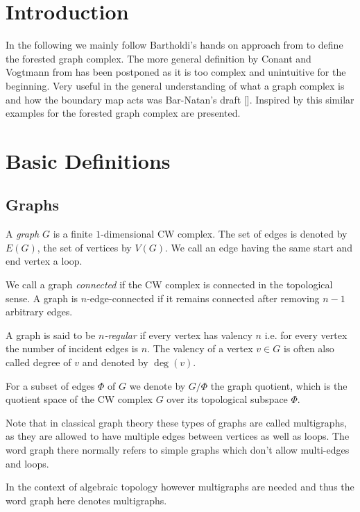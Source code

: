 %

\usepackage{todonotes}
\usepackage{./tikzit/tikzit}
\usepackage{biblatex}



	

\section{Introduction}
In the following we mainly follow Bartholdi's hands on approach from \cite{bartholdi16} to define the forested graph complex.
The more general definition by Conant and Vogtmann from \cite{conant03} has been postponed as it is too complex and unintuitive for the beginning.
Very useful in the general understanding of  what a graph complex is and how the boundary map acts was Bar-Natan's draft [].
Inspired by this similar examples for the forested graph complex are presented.

\section{Basic Definitions}
\subsection{Graphs}
\begin{definition}
	A \emph{graph} $G$ is a finite $1$-dimensional CW complex. The set of edges is denoted by $E(G)$, the set of vertices by  $V(G)$.
	We call an edge having the same start and end vertex a loop.

	We call a graph \emph{connected} if the CW complex is connected in the topological sense.
	A graph is $n$-edge-connected if it remains connected after removing  $n-1$ arbitrary edges.

	A graph is said to be \emph{$n$-regular} if every vertex has valency $n$ i.e. for every vertex the number of incident edges is $n$.
	The valency of a vertex $v \in G$ is often also called degree of $v$ and denoted by $\deg(v)$.

	For a subset of edges $\Phi$ of $G$ we denote by $G / \Phi$ the graph quotient, which is the quotient space of the CW complex $G$ over its topological subspace $\Phi$.
\end{definition}

\begin{remark}
	Note that in classical graph theory these types of graphs are called multigraphs, as they are allowed to have multiple edges between vertices as well as loops.
	The word graph there normally refers to simple graphs which don't allow multi-edges and loops.

	In the context of algebraic topology however multigraphs are needed and thus the word graph here denotes multigraphs.
\end{remark}

